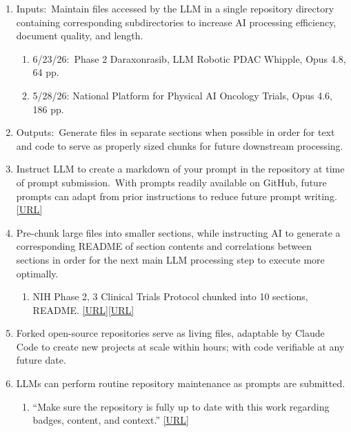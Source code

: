 \documentclass{article}
\begin{document}
\begin{enumerate}
\item Inputs:\ Maintain files accessed by the LLM in a single repository directory containing corresponding subdirectories to increase AI processing efficiency, document quality, and length.  
\begin{enumerate}
\item 6/23/26:\ Phase 2 Daraxonrasib, LLM Robotic PDAC Whipple, Opus 4.8, 64 pp. \cite{2026Ph2Darax}
\item 5/28/26: National Platform for Physical AI Oncology Trials, Opus 4.6, 186 pp. \cite{2026NatPlatf}
\end{enumerate}
\item Outputs:\ Generate files in separate sections when possible in order for text and code to serve as properly sized chunks for future downstream processing.  
\item Instruct LLM to create a markdown of your prompt in the repository at time of prompt submission.\ With prompts readily available on GitHub, future prompts can adapt from prior instructions to reduce future prompt writing.  \href{https://github.com/kevinkawchak/law-physical-ai-trials/blob/main/review/prompts/prompt-narrative.md}{[URL]}\cite{2026HR9510FL}
\item Pre-chunk large files into smaller sections, while instructing AI to generate a corresponding README of section contents and correlations between sections in order for the next main LLM processing step to execute more optimally. 
\begin{enumerate}
    \item NIH Phase 2, 3 Clinical Trials Protocol chunked into 10 sections, README. \href{https://grants.nih.gov/policy-and-compliance/policy-topics/clinical-trials/protocol-template}{[URL]}\href{https://github.com/kevinkawchak/physical-ai-oncology-trials/tree/main/trial-protocol/nih-protocol}{[URL]}\cite{2024nihprot, 2026OnPremis}
\end{enumerate}
\item Forked open-source repositories serve as living files, adaptable by Claude Code to create new projects at scale within hours; with code verifiable at any future date.  
\item LLMs can perform routine repository maintenance as prompts are submitted.
\begin{enumerate}
    \item “Make sure the repository is fully up to date with this work regarding badges, content, and context.” \href{https://github.com/kevinkawchak/Clinical-AI-Demos/blob/main/national-repositories/build-national.md}{[URL]}

\end{enumerate}
\end{enumerate}
\end{document}
